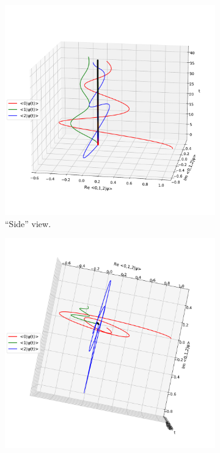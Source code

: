 %
\begin{figure}[h]
  \begin{subfigure}[b]{\textwidth}
    \centering
    \includegraphics[height=0.41\textheight,clip,trim=0 90 40 140]{img/3ldetect/NonHermitianSpaceTime_side.pdf}
    \caption{``Side'' view.}
  \end{subfigure}
  \par\bigskip
  \begin{subfigure}[b]{\textwidth}
    \centering
    \includegraphics[height=0.44\textheight,clip,trim= 0 90 20 75]{img/3ldetect/NonHermitianSpaceTime_top.pdf}

\end{subfigure}
\end{figure}

